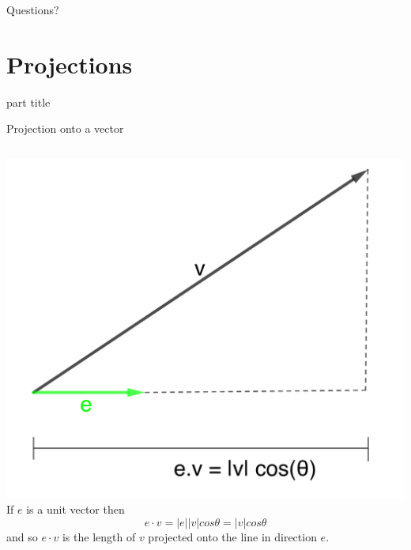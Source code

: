 \documentclass{beamer}
\begin{document}
\begin{frame}
  Questions?
\end{frame}

\section{Projections}

\begin{frame}
  \begin{beamercolorbox}[sep=12pt,center]{part title}
    \insertsection\par
  \end{beamercolorbox}
\end{frame}

\begin{frame}{Projection onto a vector}
  \begin{columns}
    \includegraphics[scale=1.7]{projection-onto-unit.png}
    If $e$ is a unit vector then
    \begin{equation*}
      e\cdot v = |e||v|cos \theta = |v|cos \theta
    \end{equation*}
    and so $e\cdot v$ is the length of $v$ projected onto the line in direction $e$.
  \end{columns}
\end{frame}
\end{document}
